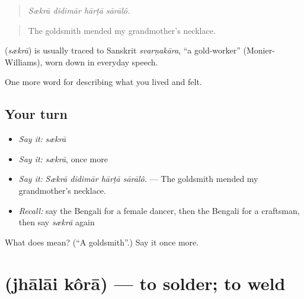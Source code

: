 \begin{quote}
   
\end{quote}

\begin{quote}
\emph{Sækrā didimār hārṭā sārālô.}
\end{quote}

\begin{quote}
The goldsmith mended my grandmother's necklace.
\end{quote}

\begin{cousinweb}
\textbf{} (\emph{sækrā}) is usually traced to Sanskrit \emph{svarṇakāra}, \textquotedblleft{}a gold-worker\textquotedblright{} (Monier-Williams), worn down in everyday speech.
\end{cousinweb}

\begin{grammarlens}[title={What you've built}]
One more word for describing what you lived and felt.
\end{grammarlens}

\subsection*{Your turn}
\begin{itemize}
\raggedright
  \item \emph{Say it:} \emph{sækrā}
  \item \emph{Say it:} \emph{sækrā}, once more
  \item \emph{Say it:} \emph{Sækrā didimār hārṭā sārālô.} — The goldsmith mended my grandmother's necklace.
  \item \emph{Recall:} say the Bengali for a female dancer, then the Bengali for a craftsman, then say \emph{sækrā} again
\end{itemize}

\begin{tcolorbox}[breakable,colback=teal!4,colframe=teal!35!black,title={Before you move on}]
What does  mean? (\textquotedblleft{}A goldsmith\textquotedblright{}.) Say it once more.
\end{tcolorbox}
\section[\texorpdfstring{\bn{ঝালাই} \bn{করা} (jhālāi kôrā)}{ঝালাই করা (jhālāi kôrā)}]{  (jhālāi kôrā) — to solder; to weld}

